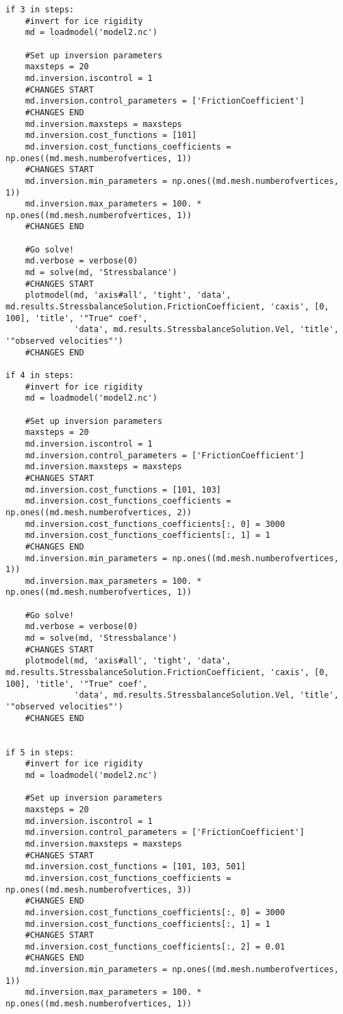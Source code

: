 \begin{verbatim}
if 3 in steps:
    #invert for ice rigidity
    md = loadmodel('model2.nc')

    #Set up inversion parameters
    maxsteps = 20
    md.inversion.iscontrol = 1
    #CHANGES START
    md.inversion.control_parameters = ['FrictionCoefficient']
    #CHANGES END
    md.inversion.maxsteps = maxsteps
    md.inversion.cost_functions = [101]
    md.inversion.cost_functions_coefficients = np.ones((md.mesh.numberofvertices, 1))
    #CHANGES START
    md.inversion.min_parameters = np.ones((md.mesh.numberofvertices, 1))
    md.inversion.max_parameters = 100. * np.ones((md.mesh.numberofvertices, 1))
    #CHANGES END

    #Go solve!
    md.verbose = verbose(0)
    md = solve(md, 'Stressbalance')
    #CHANGES START
    plotmodel(md, 'axis#all', 'tight', 'data', md.results.StressbalanceSolution.FrictionCoefficient, 'caxis', [0, 100], 'title', '"True" coef',
              'data', md.results.StressbalanceSolution.Vel, 'title', '"observed velocities"')
    #CHANGES END

if 4 in steps:
    #invert for ice rigidity
    md = loadmodel('model2.nc')

    #Set up inversion parameters
    maxsteps = 20
    md.inversion.iscontrol = 1
    md.inversion.control_parameters = ['FrictionCoefficient']
    md.inversion.maxsteps = maxsteps
    #CHANGES START
    md.inversion.cost_functions = [101, 103]
    md.inversion.cost_functions_coefficients = np.ones((md.mesh.numberofvertices, 2))
    md.inversion.cost_functions_coefficients[:, 0] = 3000
    md.inversion.cost_functions_coefficients[:, 1] = 1
    #CHANGES END
    md.inversion.min_parameters = np.ones((md.mesh.numberofvertices, 1))
    md.inversion.max_parameters = 100. * np.ones((md.mesh.numberofvertices, 1))

    #Go solve!
    md.verbose = verbose(0)
    md = solve(md, 'Stressbalance')
    #CHANGES START
    plotmodel(md, 'axis#all', 'tight', 'data', md.results.StressbalanceSolution.FrictionCoefficient, 'caxis', [0, 100], 'title', '"True" coef',
              'data', md.results.StressbalanceSolution.Vel, 'title', '"observed velocities"')
    #CHANGES END


if 5 in steps:
    #invert for ice rigidity
    md = loadmodel('model2.nc')

    #Set up inversion parameters
    maxsteps = 20
    md.inversion.iscontrol = 1
    md.inversion.control_parameters = ['FrictionCoefficient']
    md.inversion.maxsteps = maxsteps
    #CHANGES START
    md.inversion.cost_functions = [101, 103, 501]
    md.inversion.cost_functions_coefficients = np.ones((md.mesh.numberofvertices, 3))
    #CHANGES END
    md.inversion.cost_functions_coefficients[:, 0] = 3000
    md.inversion.cost_functions_coefficients[:, 1] = 1
    #CHANGES START
    md.inversion.cost_functions_coefficients[:, 2] = 0.01
    #CHANGES END
    md.inversion.min_parameters = np.ones((md.mesh.numberofvertices, 1))
    md.inversion.max_parameters = 100. * np.ones((md.mesh.numberofvertices, 1))


\end{verbatim}
